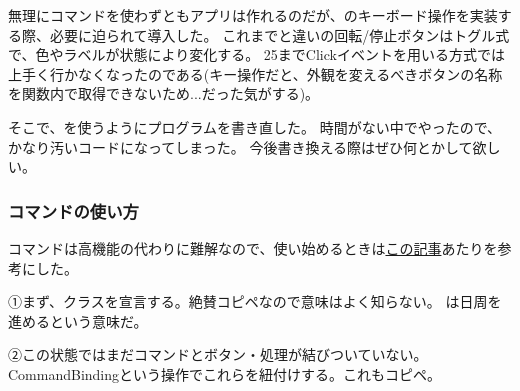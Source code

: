 \documentclass[letterpaper,10pt,dvipdfmx]{sphinxmanual}
\begin{document}
無理にコマンドを使わずともアプリは作れるのだが、のキーボード操作を実装する際、必要に迫られて導入した。
これまでと違いの回転/停止ボタンはトグル式で、色やラベルが状態により変化する。
25までClickイベントを用いる方式では上手く行かなくなったのである(キー操作だと、外観を変えるべきボタンの名称を関数内で取得できないため...だった気がする)。

そこで、を使うようにプログラムを書き直した。
時間がない中でやったので、かなり汚いコードになってしまった。
今後書き換える際はぜひ何とかして欲しい。


\subsubsection{コマンドの使い方}
\label{\detokenize{nissyu-idohen/pc-software-code:}}\label{\detokenize{nissyu-idohen/pc-software-code:id10}}
コマンドは高機能の代わりに難解なので、使い始めるときは\href{http://techoh.net/wpf-make-command-in-5steps/}{この記事}あたりを参考にした。

①まず、クラスを宣言する。絶賛コピペなので意味はよく知らない。
は日周を進めるという意味だ。

\begin{sphinxVerbatim}[commandchars=\\\{\}]
        
\end{sphinxVerbatim}

②この状態ではまだコマンドとボタン・処理が結びついていない。
CommandBindingという操作でこれらを紐付けする。これもコピペ。

\begin{sphinxVerbatim}[commandchars=\\\{\}]
  
       
\end{sphinxVerbatim}
\end{document}
